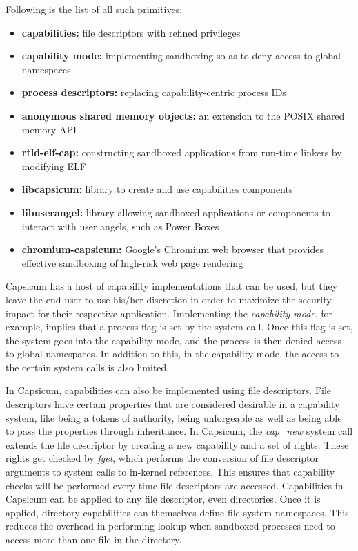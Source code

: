 Following is the list of all such primitives:

		\begin{itemize}
		    \item \textbf{capabilities:} file descriptors with refined privileges
   		    \item \textbf{capability mode:} implementing sandboxing so as to deny access to global namespaces
    		    \item \textbf{process descriptors:} replacing capability-centric process IDs
    		    \item \textbf{anonymous shared memory objects:} an extension to the POSIX shared memory API
    		    \item \textbf{rtld-elf-cap:} constructing sandboxed applications from run-time linkers by modifying ELF 
    		    \item \textbf{libcapsicum:} library to create and use capabilities components
    		    \item \textbf{libuserangel:} library allowing sandboxed applications or components to interact with user angels, such as Power Boxes
    		    \item \textbf{chromium-capsicum:} Google's Chromium web browser that provides effective sandboxing of high-risk web page rendering

		\end{itemize}
		
Capsicum has a host of capability implementations that can be used, but they leave the end user to use his/her discretion in order to maximize the security impact for their respective application. Implementing the \textit{capability mode}, for example, implies that a process flag is set by the system call. Once this flag is set, the system goes into the capability mode, and the process is then denied access to global namespaces. In addition to this, in the capability mode, the access to the certain system calls is also limited.

In Capsicum, capabilities can also be implemented using file descriptors. File descriptors have certain properties that are considered desirable in a capability system, like being a tokens of authority, being unforgeable as well as being able to pass the properties through inheritance. In Capsicum, the \textit{cap\_new} system call extends the file descriptor by creating a new capability and a set of rights. These rights get checked by \textit{fget}, which performs the conversion of file descriptor arguments to system calls to in-kernel references. This ensures that capability checks will be performed every time file descriptors are accessed. Capabilities in Capsicum can be applied to any file descriptor, even directories.  Once it is applied, directory capabilities can themselves define file system namespaces. This reduces the overhead in performing lookup when sandboxed processes need to access more than one file in the directory.


